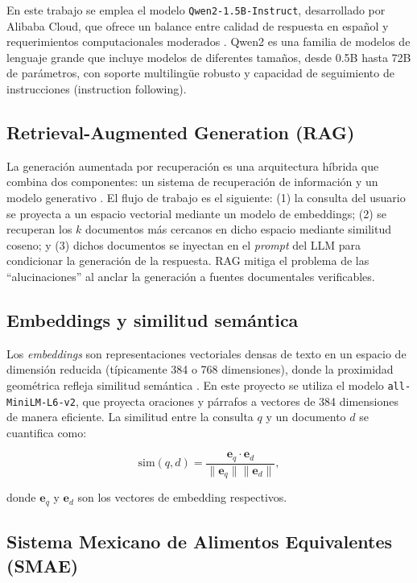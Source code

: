 En este trabajo se emplea el modelo \texttt{Qwen2-1.5B-Instruct}, desarrollado por Alibaba Cloud, que ofrece un balance entre calidad de respuesta en español y requerimientos computacionales moderados \cite{qwen2_2024}. Qwen2 es una familia de modelos de lenguaje grande que incluye modelos de diferentes tamaños, desde 0.5B hasta 72B de parámetros, con soporte multilingüe robusto y capacidad de seguimiento de instrucciones (instruction following).

\subsection{Retrieval-Augmented Generation (RAG)}

La generación aumentada por recuperación es una arquitectura híbrida que combina dos componentes: un sistema de recuperación de información y un modelo generativo \cite{lewis_retrieval-augmented_2020}. El flujo de trabajo es el siguiente: (1) la consulta del usuario se proyecta a un espacio vectorial mediante un modelo de embeddings; (2) se recuperan los $k$ documentos más cercanos en dicho espacio mediante similitud coseno; y (3) dichos documentos se inyectan en el \textit{prompt} del LLM para condicionar la generación de la respuesta. RAG mitiga el problema de las ``alucinaciones'' al anclar la generación a fuentes documentales verificables.

\subsection{Embeddings y similitud semántica}

Los \textit{embeddings} son representaciones vectoriales densas de texto en un espacio de dimensión reducida (típicamente 384 o 768 dimensiones), donde la proximidad geométrica refleja similitud semántica \cite{reimers_sentence-bert_2019}. En este proyecto se utiliza el modelo \texttt{all-MiniLM-L6-v2}, que proyecta oraciones y párrafos a vectores de 384 dimensiones de manera eficiente. La similitud entre la consulta $q$ y un documento $d$ se cuantifica como:

\begin{equation}
    \text{sim}(q, d) = \frac{\mathbf{e}_q \cdot \mathbf{e}_d}{\|\mathbf{e}_q\| \|\mathbf{e}_d\|},
    \label{eq:cosine}
\end{equation}

 donde $\mathbf{e}_q$ y $\mathbf{e}_d$ son los vectores de embedding respectivos.

\subsection{Sistema Mexicano de Alimentos Equivalentes (SMAE)}


